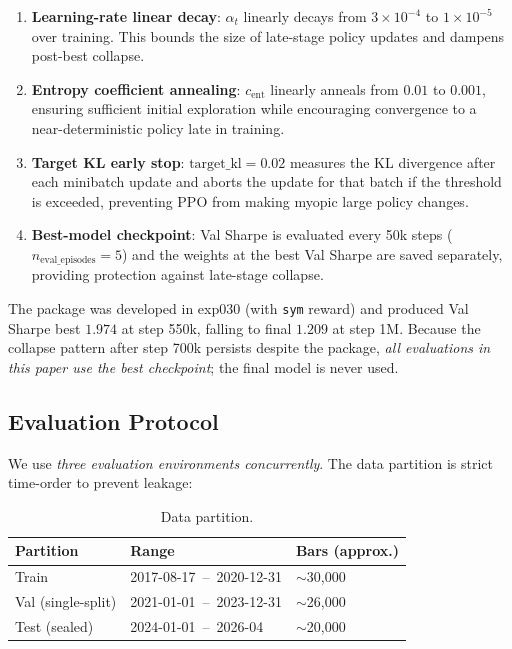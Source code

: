 \documentclass[11pt, a4paper]{article}
\begin{document}
\begin{enumerate}[leftmargin=*]
\item \textbf{Learning-rate linear decay}: $\alpha_t$ linearly decays from
$3 \times 10^{-4}$ to $1 \times 10^{-5}$ over training. This bounds the size
of late-stage policy updates and dampens post-best collapse.
\item \textbf{Entropy coefficient annealing}: $c_{\text{ent}}$ linearly anneals
from $0.01$ to $0.001$, ensuring sufficient initial exploration while
encouraging convergence to a near-deterministic policy late in training.
\item \textbf{Target KL early stop}: $\text{target\_kl}=0.02$ measures the KL
divergence after each minibatch update and aborts the update for that batch if
the threshold is exceeded, preventing PPO from making myopic large policy
changes.
\item \textbf{Best-model checkpoint}: Val Sharpe is evaluated every 50k steps
($n_{\text{eval\_episodes}}=5$) and the weights at the best Val Sharpe are
saved separately, providing protection against late-stage collapse.
\end{enumerate}

The package was developed in exp030 (with \texttt{sym} reward) and produced
Val Sharpe best $1.974$ at step 550k, falling to final $1.209$ at step 1M.
Because the collapse pattern after step 700k persists despite the package,
\emph{all evaluations in this paper use the best checkpoint}; the final model
is never used.

\subsection{Evaluation Protocol}
\label{sec:eval_protocol}

We use \emph{three evaluation environments concurrently}. The data partition
is strict time-order to prevent leakage:

\begin{table}[!htbp]
\centering
\caption{Data partition.}
\begin{tabular}{lll}
\toprule
Partition & Range & Bars (approx.) \\
\midrule
Train & 2017-08-17 \,--\, 2020-12-31 & $\sim$30{,}000 \\
Val (single-split) & 2021-01-01 \,--\, 2023-12-31 & $\sim$26{,}000 \\
Test (sealed) & 2024-01-01 \,--\, 2026-04 & $\sim$20{,}000 \\
\bottomrule
\end{tabular}
\label{tab:data_split}
\end{table}
\end{document}
